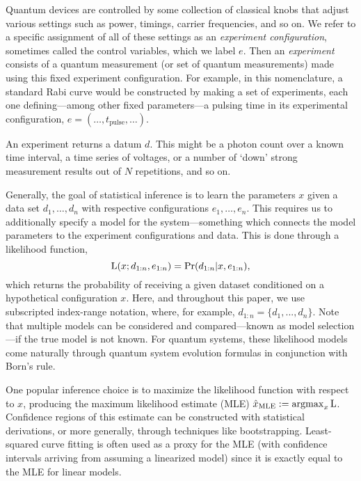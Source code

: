 \documentclass[aps,nofootinbib,twocolumn,superscriptaddress]{revtex4}
\newcommand{\mps}{x}
\newcommand{\eps}{e}
\newcommand{\data}{d}
\newcommand{\MLE}{\text{MLE}}
\begin{document}
Quantum devices are controlled by some collection of
classical knobs that adjust various settings
such as power, timings, carrier frequencies, and so on.
We refer to a specific assignment of all of these settings as an
\textit{experiment configuration}, sometimes called the control
variables, which we label $\eps$.
Then an \textit{experiment}
consists of a quantum measurement (or set of quantum measurements)
made using this fixed experiment configuration.
For example, in this nomenclature, a standard Rabi curve
would be constructed by making a set of
experiments, each one defining---among other fixed parameters---a
pulsing time in its experimental configuration,
$\eps=(\ldots,t_\text{pulse},\ldots)$.

An experiment returns a datum $\data$.
This might be a photon count
over a known time interval, a time series of voltages,
or a number of `down' strong measurement results out of $N$
repetitions, and so on.

Generally, the goal of statistical inference is to learn the parameters
$\mps$ given a data set $\data_1,\ldots,\data_n$ with respective
configurations $\eps_1,\ldots,\eps_n$.
This requires us to additionally specify a model for the
system---something which connects the model parameters to the experiment
configurations and data.
This is done through a likelihood function,
\begin{equation}
    \Lhood(\mps;\data_{1:n},\eps_{1:n})
        = \Pr(\data_{1:n}|\mps,\eps_{1:n}),
    \label{eq:general-likelihood-function}
\end{equation}
which returns the probability of receiving a given dataset conditioned
on a hypothetical configuration $\mps$.
Here, and throughout this paper, we use subscripted index-range notation,
where, for example, $\data_{1:n}=\{\data_1,...,\data_n\}$.
Note that multiple models can be considered and compared---known
as model selection---if the
true model is not known.
For quantum systems, these likelihood models come naturally
through quantum system evolution formulas in conjunction
with Born's rule.

One popular inference choice is to maximize the likelihood function
with respect to $\mps$, producing the maximum likelihood estimate (MLE)
$\hat{\mps}_\MLE:=\operatorname{argmax}_\mps \Lhood$.
Confidence regions of this estimate can be constructed
with statistical derivations, or more generally, through techniques like bootstrapping.
Least-squared curve fitting is often used as a proxy for the MLE (with
confidence intervals arriving from assuming
a linearized model) since it is exactly equal to the MLE
for linear models.
\end{document}
